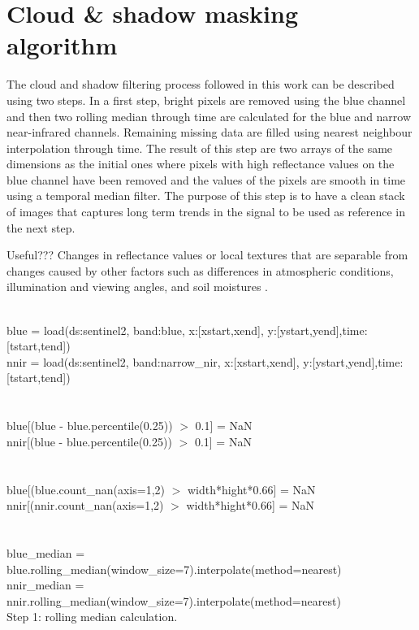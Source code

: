 \documentclass[essd, manuscript]{copernicus}
\begin{document}


\appendix
\section{Cloud \& shadow masking algorithm} %

The cloud and shadow filtering process followed in this work can be described using two steps. In a first step, bright pixels are removed using the blue channel and then two rolling median through time are calculated for the blue and narrow near-infrared channels. Remaining missing data are filled using nearest neighbour interpolation through time. The result of this step are two arrays of the same dimensions as the initial ones where pixels with high reflectance values on the blue channel have been removed and the values of the pixels are smooth in time using a temporal median filter. The purpose of this step is to have a clean stack of images that captures long term trends in the signal to be used as reference in the next step.

Useful??? Changes in reflectance values or local textures that are separable from changes caused by other factors such as differences in atmospheric conditions, illumination and viewing angles, and soil moistures \citep{deng2008pca}.

\begin{algorithm}[H]
\SetAlgoLined
 \\
 blue = load(ds:sentinel2, band:blue, x:[xstart,xend], y:[ystart,yend],time:[tstart,tend])\\
 nnir = load(ds:sentinel2, band:narrow\_nir, x:[xstart,xend], y:[ystart,yend],time:[tstart,tend])\\
 \\
 \\
 blue[(blue - blue.percentile(0.25)) $>$ 0.1] = NaN\\
 nnir[(blue - blue.percentile(0.25)) $>$ 0.1] = NaN\\
 \\
 \\
 blue[(blue.count\_nan(axis=1,2) $>$ width*hight*0.66] = NaN\\
 nnir[(nnir.count\_nan(axis=1,2) $>$ width*hight*0.66] = NaN\\
 \\
 \\
 blue\_median = blue.rolling\_median(window\_size=7).interpolate(method=nearest)\\
 nnir\_median = nnir.rolling\_median(window\_size=7).interpolate(method=nearest)\\
 \caption{Step 1: rolling median calculation.}
\end{algorithm}
\end{document}
